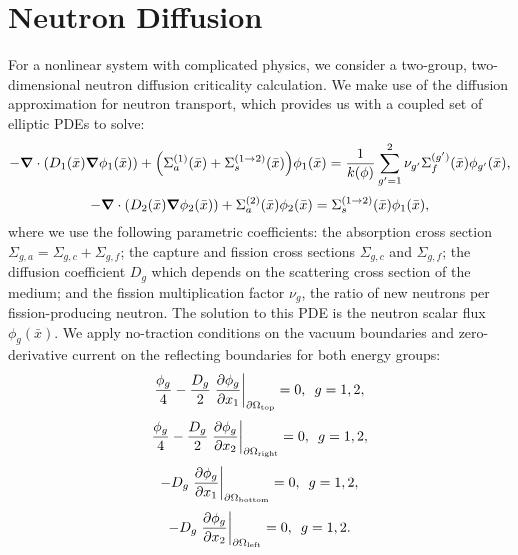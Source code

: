 \section{Neutron Diffusion}
For a nonlinear system with complicated physics, we consider a two-group, two-dimensional neutron diffusion
criticality calculation.  We make use of the diffusion approximation for neutron transport, which provides us
with a coupled set of elliptic PDEs to solve:
\begin{equation}
-\grad\cdot\qty( D_1(\bar x)\grad\phi_1(\bar x))+\qty(\Sigma_{a}^{(1)}(\bar x)+\Sigma_{s}^{(1\to2)}(\bar x))\phi_1(\bar x) = \frac{1}{k(\phi)}\sum_{g'=1}^2\nu_{g'}\Sigma_{f}^{(g')}(\bar x)\phi_{g'}(\bar x),
\end{equation}
\begin{equation}
-\grad \cdot\qty(D_2(\bar x)\grad \phi_2(\bar x))+\Sigma_{a}^{(2)}(\bar x)\phi_2(\bar x) = \Sigma_{s}^{(1\to 2)}(\bar x)\phi_1(\bar x),
\end{equation}
where we use the following parametric coefficients: the absorption cross section
$\Sigma_{g,a}=\Sigma_{g,c}+\Sigma_{g,f}$; the capture and fission cross sections $\Sigma_{g,c}$ and
$\Sigma_{g,f}$; the diffusion coefficient $D_g$ which depends on the scattering cross section of the medium;
and the fission multiplication factor $\nu_g$, the ratio of new neutrons per fission-producing neutron.  The
solution to this PDE is the neutron scalar flux $\phi_g(\bar x)$.  We apply no-traction conditions on the
vacuum boundaries and zero-derivative current on the reflecting boundaries for both energy groups:
\begin{equation}
\frac{\phi_g}{4}-\frac{D_g}{2}\eval{\pdv{\phi_g}{x_1}}_{\partial \Omega_\text{top}}=0,\hspace{5pt} g=1,2,
\end{equation}
\begin{equation}
\frac{\phi_g}{4}-\frac{D_g}{2}\eval{\pdv{\phi_g}{x_2}}_{\partial \Omega_\text{right}}=0,\hspace{5pt} g=1,2,
\end{equation}
\begin{equation}
-D_g\eval{\pdv{\phi_g}{x_1}}_{\partial \Omega_\text{bottom}}=0,\hspace{5pt} g=1,2,
\end{equation}
\begin{equation}
-D_g\eval{\pdv{\phi_g}{x_2}}_{\partial \Omega_\text{left}}=0,\hspace{5pt} g=1,2.
\end{equation}
\\
